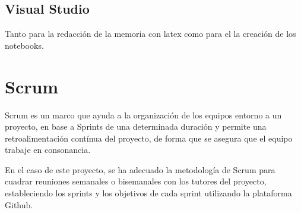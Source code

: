 \subsection{Visual Studio}

Tanto para la redacción de la memoria con latex como para el la creación de los notebooks.

\section{Scrum}
Scrum es un marco que ayuda a la organización de los equipos entorno a un proyecto, en base a Sprints de una determinada duración y permite una retroalimentación
contínua del proyecto, de forma que se asegura que el equipo trabaje en consonancia.

En el caso de este proyecto, se ha adecuado la metodología de Scrum para cuadrar reuniones semanales o bisemanales con los tutores del proyecto, estableciendo
los sprints y los objetivos de cada sprint utilizando la plataforma Github.





